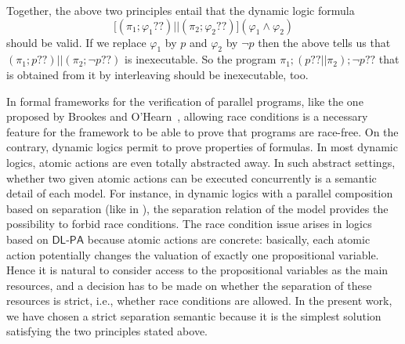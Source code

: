 \documentclass{llncs}
\newcommand{\pll}{ {||} }							%
\newcommand{\testendo}{?\!\!?}			%
\newcommand{\Dlpa}{\ensuremath{\mathsf{DL\text{-}PA}}\xspace}
\newcommand{\ah}[1]{\footnote{\textbf{AH:} #1}}
\newcommand{\lbox}[1]{ \big[ #1 \big] }
\renewcommand{\phi}{\varphi}
\begin{document}
Together, the above two principles entail that the dynamic logic formula
$$ \lbox{ (\pi_1 ; \phi_1 \testendo ) \pll (\pi_2 ; \phi_2 \testendo ) } (\phi_1 \land \phi_2) $$
should be valid. 
If we replace $\phi_1$ by $p$ and $\phi_2$ by $\lnot p$ then the above tells us that 
$(\pi_1 ; p \testendo ) \pll (\pi_2 ; \lnot p \testendo )$ is inexecutable. 
So the program
$\pi_1 ; (p \testendo \pll \pi_2) ; \lnot p \testendo $ 
that is obtained from it by interleaving should be inexecutable, too. 

In formal frameworks for the verification of parallel programs, like the one proposed by Brookes
and O'Hearn~\cite{Brookes04,OHearn04}, allowing race conditions is a necessary feature for the
framework to be able to prove that programs are race-free.
On the contrary, dynamic logics permit to prove properties of formulas.
In most dynamic logics, atomic actions are even totally abstracted away.
In such abstract settings,
whether two given atomic actions can be executed concurrently is a semantic detail of each model.
For instance, in dynamic logics with a parallel composition based on separation (like in
\cite{DBLP:journals/entcs/BenevidesFV11,Boudou16,DBLP:journals/logcom/BalbianiB18}),
the separation relation of the model provides the possibility to forbid race conditions.
The race condition issue arises in logics based on \Dlpa because atomic actions are concrete:
basically, each atomic action potentially changes the valuation of exactly one propositional variable.
Hence it is natural to consider access to the propositional variables as the main resources,
and a decision has to be made on whether the separation of these resources is strict,
i.e., whether race conditions are allowed.
In the present work, we have chosen a strict separation semantic because it is the simplest solution satisfying
the two principles stated above.
\end{document}
